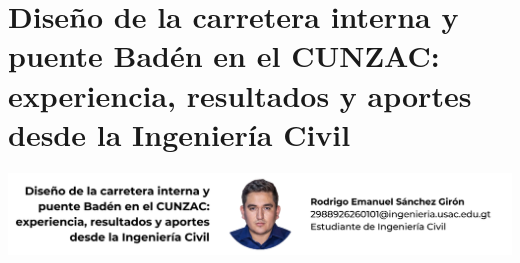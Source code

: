 \documentclass[12pt,spanish,Letterpaper,openany]{book}
\begin{document}
\medskip

\hypertarget{art03}{%
\chapter{Diseño de la carretera interna y puente Badén en el CUNZAC: experiencia, resultados y aportes desde la Ingeniería Civil}\label{art03}}

\begin{center}\includegraphics[width=1\linewidth]{autores/art03} \end{center}
\end{document}
